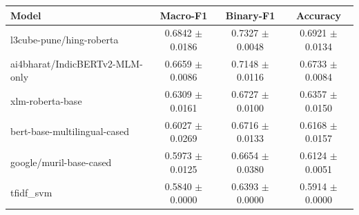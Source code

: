 \begin{tabular}{lccc}
\toprule
Model & Macro-F1 & Binary-F1 & Accuracy \\
\midrule
l3cube-pune/hing-roberta & 0.6842 $\pm$ 0.0186 & 0.7327 $\pm$ 0.0048 & 0.6921 $\pm$ 0.0134 \\
ai4bharat/IndicBERTv2-MLM-only & 0.6659 $\pm$ 0.0086 & 0.7148 $\pm$ 0.0116 & 0.6733 $\pm$ 0.0084 \\
xlm-roberta-base & 0.6309 $\pm$ 0.0161 & 0.6727 $\pm$ 0.0100 & 0.6357 $\pm$ 0.0150 \\
bert-base-multilingual-cased & 0.6027 $\pm$ 0.0269 & 0.6716 $\pm$ 0.0133 & 0.6168 $\pm$ 0.0157 \\
google/muril-base-cased & 0.5973 $\pm$ 0.0125 & 0.6654 $\pm$ 0.0380 & 0.6124 $\pm$ 0.0051 \\
tfidf_svm & 0.5840 $\pm$ 0.0000 & 0.6393 $\pm$ 0.0000 & 0.5914 $\pm$ 0.0000 \\
\bottomrule
\end{tabular}
